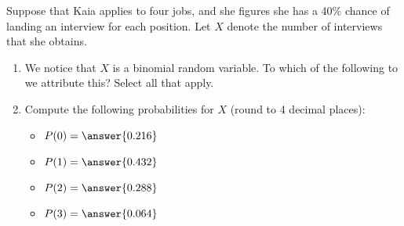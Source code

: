 \documentclass{ximera}
\begin{document}
\begin{question}
Suppose that Kaia applies to four jobs, and she figures she has a 40\% chance of landing an interview for each position. Let $X$ denote the number of interviews that she obtains.

\begin{enumerate}
\item We notice that $X$ is a binomial random variable.  To which of the following to we attribute this?  Select all that apply.


\begin{selectAll}
\end{selectAll}


\item Compute the following probabilities for $X$ (round to 4 decimal places):
\begin{itemize}
\item $P(0)=\answer{0.216}$
\item $P(1)=\answer{0.432}$
\item $P(2)=\answer{0.288}$
\item $P(3)=\answer{0.064}$
\end{itemize}



\end{enumerate}


\end{question}
\end{document}
